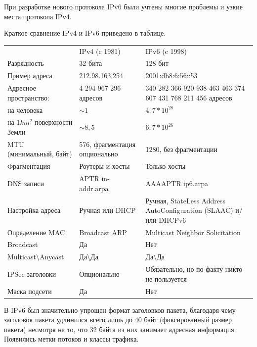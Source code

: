 \documentclass[10pt, a5paper]{article}
\begin{document}
При разработке нового протокола IPv6 были учтены многие проблемы и узкие места протокола IPv4.

Краткое сравнение IPv4  и IPv6 приведено в таблице.

\begin{table}
  \centering
  \begin{tabular}{ p{3cm} p{3cm} p{4cm} }
      							& IPv4 (c 1981) 	& IPv6 (c 1998) \\
     Разрядность  				&  32 бита 			& 128 бит  \\
     Пример адреса  			&  212.98.163.254  	&  2001:db8:6:56::53  \\
     Адресное пространство:  	&  4 294 967 296 адресов  &  340 282 366 920 938 463 463 374 607 431 768 211 456 адресов  \\
     на человека  				&  $\sim1$  			&  $4,7*10^{28}$  \\
     на $1 km^2$ поверхности Земли  &  $\sim8,5$  	&  $6,7*10^{26}$  \\
     MTU (минимальный, байт)  	&  576, фрагментация опционально  &  1280, без фрагментации  \\
     Фрагментация  				&  Роутеры и хосты 	&  Только хосты  \\
     DNS записи  				&  A\newline PTR in-addr.arpa				&  AAAA\newline PTR ip6.arpa \\
     Настройка адреса  			&  Ручная или DHCP 	&  Ручная, StateLess Address AutoConfiguration (SLAAC) и/или DHCPv6  \\
     Определение MAC  			&  Broadcast ARP  	&  Multicast Neighbor Solicitation  \\
     Broadcast  				&  Да  				&  Нет  \\
     Multicast\textbackslash{}Anycast  &  Да\textbackslash{}Да  &  Да\textbackslash{}Да  \\
     IPSec заголовки  			&  Опционально  	&  Обязательно, но по факту никто не пользуется \\
     Маска подсети  			&  Да  				&  Нет  \\
  \end{tabular}
\end{table}

В IPv6 был значительно упрощен формат заголовков пакета, благодаря чему заголовок пакета удлинился всего лишь до 40 байт (фиксированный размер пакета) несмотря на то, что 32 байта из них занимает адресная информация. Появились метки потоков и классы трафика.
\end{document}
